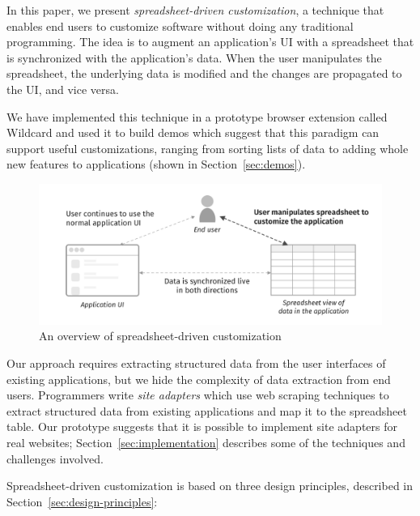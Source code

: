\documentclass[english,submission]{programming}
\begin{document}
In this paper, we present \emph{spreadsheet-driven customization}, a
technique that enables end users to customize software without doing any
traditional programming. The idea is to augment an application's UI with
a spreadsheet that is synchronized with the application's data. When the
user manipulates the spreadsheet, the underlying data is modified and
the changes are propagated to the UI, and vice versa.

We have implemented this technique in a prototype browser extension
called Wildcard and used it to build demos which suggest that this
paradigm can support useful customizations, ranging from sorting lists
of data to adding whole new features to applications (shown in
Section~\ref{sec:demos}).

\begin{figure}
\hypertarget{fig:overview}{%
\centering
\includegraphics{media/overview-300dpi.png}
\caption{An overview of spreadsheet-driven
customization}\label{fig:overview}
}
\end{figure}

Our approach requires extracting structured data from the user
interfaces of existing applications, but we hide the complexity of data
extraction from end users. Programmers write \emph{site adapters} which
use web scraping techniques to extract structured data from existing
applications and map it to the spreadsheet table. Our prototype suggests
that it is possible to implement site adapters for real websites;
Section~\ref{sec:implementation} describes some of the techniques and
challenges involved.

Spreadsheet-driven customization is based on three design principles,
described in Section~\ref{sec:design-principles}:
\end{document}
